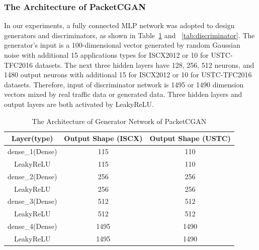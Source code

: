 \documentclass[conference]{IEEEtran}
\begin{document}
\subsubsection {The Architecture of PacketCGAN}
In our experiments, a fully connected MLP network was adopted to design generators and discriminators, as shown in Table~\ref{tab:generator} and ~\ref{tab:discriminator}. The generator's input is a 100-dimensional vector generated by random Gaussian noise with additional 15 applications types for ISCX2012 or 10 for USTC-TFC2016 datasets. The next three hidden layers have 128, 256, 512 neurons, and 1480 output neurons with additional 15 for ISCX2012 or 10 for USTC-TFC2016 datasets. Therefore, input of discriminator network is 1495 or 1490 dimension vectors mixed by real traffic data or generated data. Three hidden layers and output layers are both activated by LeakyReLU.


\linespread{1.5}
\begin{table}[htbp]
	\caption{The Architecture of Generator Network of PacketCGAN}
	\fontsize{6.5}{8}\selectfont  
	\begin{center}
		\begin{tabular}{c| c| c}
			\hline
			\textbf{Layer(type)}&{\textbf{Output Shape (ISCX)}} &{\textbf{Output Shape (USTC)}} \\
			\hline
			dense\_1(Dense) 	& 115 	& 110  \\
			LeakyReLU 			& 115  	& 110   \\
			dense\_2(Dense) 	& 256 	& 256	\\
			LeakyReLU 			& 256	& 256    \\
			dense\_3(Dense) 	& 512 	& 512   \\
			LeakyReLU 			& 512	& 512   \\
			dense\_4(Dense)		 & 1495 & 1490	\\
			LeakyReLU 			& 1495		& 1490 \\	

			\hline
		\end{tabular}
		\label{tab:generator}
	\end{center}
\end{table}
\end{document}
